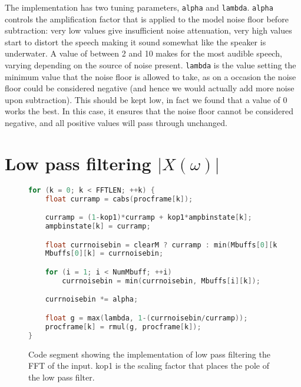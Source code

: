 \documentclass[11pt]{article} %
\begin{document}
{The implementation has two tuning parameters, \verb"alpha" and \verb"lambda". \verb"alpha" controls the amplification factor that is applied to the model noise floor before subtraction: very low values give insufficient noise attenuation, very high values start to distort the speech making it sound somewhat like the speaker is underwater. A value of between 2 and 10 makes for the most audible speech, varying depending on the source of noise present. 
\verb"lambda" is the value setting the minimum value that the noise floor is allowed to take, as on a occasion the noise floor could be considered negative (and hence we would actually add more noise upon subtraction). This should be kept low, in fact we found that a value of 0 works the best. In this case, it ensures that the noise floor cannot be considered negative, and all positive values will pass through unchanged.


\section{Low pass filtering $\lvert X(\omega) \rvert $} 
\label{sec:IIRamp}
\begin{figure}[htbp]
	\begin{center}
    \begin{lstlisting}[language = C]
for (k = 0; k < FFTLEN; ++k) {
	float curramp = cabs(procframe[k]); 

	curramp = (1-kop1)*curramp + kop1*ampbinstate[k];
	ampbinstate[k] = curramp;

	float currnoisebin = clearM ? curramp : min(Mbuffs[0][k], curramp);
	Mbuffs[0][k] = currnoisebin;

	for (i = 1; i < NumMbuff; ++i)
		currnoisebin = min(currnoisebin, Mbuffs[i][k]);

	currnoisebin *= alpha;

	float g = max(lambda, 1-(currnoisebin/curramp));
	procframe[k] = rmul(g, procframe[k]);
}
    \end{lstlisting}
  \end{center}
	\caption{Code segment showing the implementation of low pass filtering the FFT of the input. kop1 is the scaling factor that places the pole of the low pass filter.}
	\label{code:LPFxOMG}
\end{figure}

}
\end{document}
